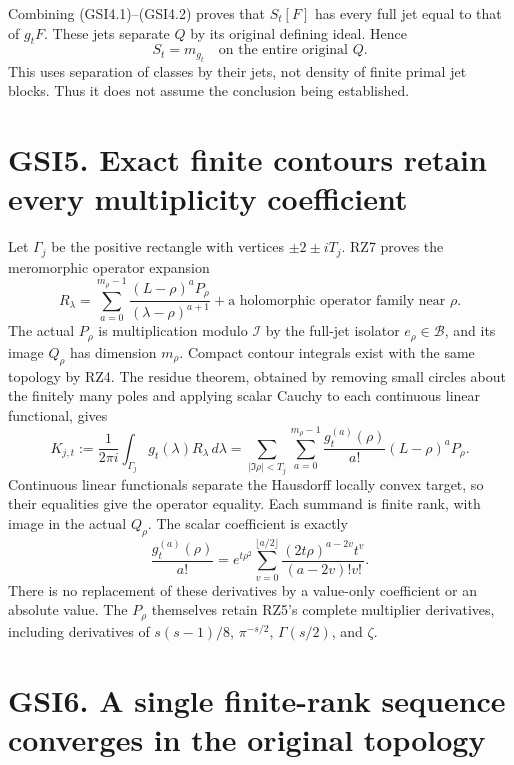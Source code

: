 Combining (GSI4.1)--(GSI4.2) proves that \(S_t[F]\) has every full jet
equal to that of \(g_tF\). These jets separate \(Q\) by its original
defining ideal. Hence \[
\boxed{S_t=m_{g_t}\quad\text{on the entire original }Q.}
\tag{GSI4.3}
\] This uses separation of classes by their jets, not density of finite
primal jet blocks. Thus it does not assume the conclusion being
established.

\section{GSI5. Exact finite contours retain every multiplicity
coefficient}\label{gsi5.-exact-finite-contours-retain-every-multiplicity-coefficient}

Let \(\Gamma_j\) be the positive rectangle with vertices
\(\pm2\pm iT_j\). RZ7 proves the meromorphic operator expansion \[
R_\lambda=\sum_{a=0}^{m_\rho-1}
\frac{(L-\rho)^aP_\rho}{(\lambda-\rho)^{a+1}}
+\text{a holomorphic operator family near }\rho.
\tag{GSI5.1}
\] The actual \(P_\rho\) is multiplication modulo \(\mathcal I\) by the
full-jet isolator \(e_\rho\in\mathcal B\), and its image \(Q_\rho\) has
dimension \(m_\rho\). Compact contour integrals exist with the same
topology by RZ4. The residue theorem, obtained by removing small circles
about the finitely many poles and applying scalar Cauchy to each
continuous linear functional, gives \[
K_{j,t}:=\frac1{2\pi i}\int_{\Gamma_j}g_t(\lambda)R_\lambda\,d\lambda
=\sum_{|\Im\rho|<T_j}\sum_{a=0}^{m_\rho-1}
\frac{g_t^{(a)}(\rho)}{a!}(L-\rho)^aP_\rho.
\tag{GSI5.2}
\] Continuous linear functionals separate the Hausdorff locally convex
target, so their equalities give the operator equality. Each summand is
finite rank, with image in the actual \(Q_\rho\). The scalar coefficient
is exactly \[
\frac{g_t^{(a)}(\rho)}{a!}
=e^{t\rho^2}\sum_{v=0}^{\lfloor a/2\rfloor}
\frac{(2t\rho)^{a-2v}t^v}{(a-2v)!v!}.
\tag{GSI5.3}
\] There is no replacement of these derivatives by a value-only
coefficient or an absolute value. The \(P_\rho\) themselves retain RZ5's
complete multiplier derivatives, including derivatives of \(s(s-1)/8\),
\(\pi^{-s/2}\), \(\Gamma(s/2)\), and \(\zeta\).

\section{GSI6. A single finite-rank sequence converges in the original
topology}\label{gsi6.-a-single-finite-rank-sequence-converges-in-the-original-topology}

